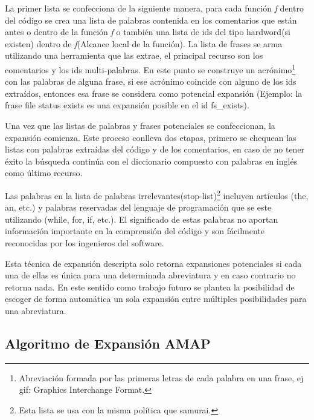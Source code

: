 \documentclass[12pt]{report}
\begin{document}
La primer lista se confecciona de la siguiente manera, para cada función \textit{f} dentro del código se crea una lista de palabras contenida en los comentarios que están antes o dentro de la función \textit{f} o también una lista de ids del tipo hardword(si existen) dentro de \textit{f}(Alcance local de la función). La lista de frases se arma utilizando una herramienta que las extrae, el principal recurso son los comentarios y los ids multi-palabras. En este punto se construye un acrónimo\footnote[1]{Abreviación formada por las primeras letras de cada palabra en una frase, ej gif: Graphics Interchange Format.} con las palabras de alguna frase, si ese acrónimo coincide con alguno de los ids extraídos, entonces esa frase se considera como potencial expansión (Ejemplo: la frase \textsf{file status exists} es una expansión posible en el id \textsf{fs\_exists}).

Una vez que las listas de palabras y frases potenciales se confeccionan, la expansión comienza. Este proceso conlleva dos etapas, primero se chequean las listas con palabras extraídas del código y de los comentarios, en caso de no tener éxito la búsqueda continúa con el diccionario compuesto con palabras en inglés como último recurso.

Las palabras en la lista de palabras irrelevantes(stop-list)\footnote[2]{Esta lista se usa con la misma política que samurai.} incluyen artículos (the, an, etc.) y palabras reservadas del lenguaje de programación que se este utilizando (\textsf{while, for, if,} etc.). El significado de estas palabras no aportan información importante en la comprensión del código y son fácilmente reconocidas por los ingenieros del software.


Esta técnica de expansión descripta solo retorna expansiones potenciales si cada una de ellas es única para una determinada abreviatura y en caso contrario no retorna nada. En este sentido como trabajo futuro se plantea la posibilidad de escoger de forma automática un sola expansión entre múltiples posibilidades para una abreviatura\cite{LFBEX07,EZH08}.

\subsection{Algoritmo de Expansión AMAP}
\end{document}
